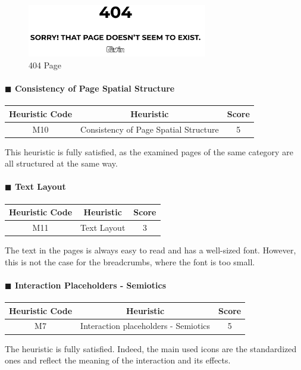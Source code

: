 \documentclass[11pt]{article} %
\begin{document}
\begin{figure}[H]
  \centering
  \includegraphics[width=0.7\textwidth]{Images/Screenshots/404.png}
  \caption{404 Page}
\end{figure}

\paragraph{$\blacksquare$ Consistency of Page Spatial Structure}
\begin{center}
    \begin{tabular}{|c|c|c|} 
    \hline
    \textbf{Heuristic Code} & \textbf{Heuristic} & \textbf{Score}\\ 
    \hline
    M10 & Consistency of Page Spatial Structure & 5 \\
    \hline
    \end{tabular}
\end{center}
This heuristic is fully satisfied, as the examined pages of the same category are all structured at the same way.

\paragraph{$\blacksquare$ Text Layout}
\begin{center}
    \begin{tabular}{|c|c|c|} 
    \hline
    \textbf{Heuristic Code} & \textbf{Heuristic} & \textbf{Score}\\ 
    \hline
    M11 & Text Layout & 3 \\
    \hline
    \end{tabular}
\end{center}
The text in the pages is always easy to read and has a well-sized font. However, this is not the case for the breadcrumbs, where the font is too small.

\paragraph{$\blacksquare$ Interaction Placeholders - Semiotics}
\begin{center}
    \begin{tabular}{|c|c|c|} 
    \hline
    \textbf{Heuristic Code} & \textbf{Heuristic} & \textbf{Score}\\ 
    \hline
    M7 & Interaction placeholders - Semiotics & 5 \\
    \hline
    \end{tabular}
\end{center}
The heuristic is fully satisfied. Indeed, the main used icons are the standardized ones and reflect the meaning of the interaction and its effects.
\end{document}
